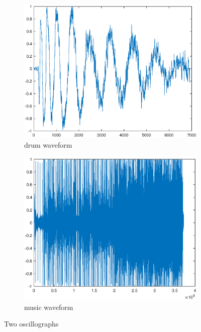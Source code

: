 \begin{figure}[h!]
	\centering
	\begin{subfigure}[t]{0.45\linewidth}
		\includegraphics[width=1\linewidth]{figures/part1/drum.eps}
		\caption{drum waveform}
		\label{fig:drum}
	\end{subfigure}
	\begin{subfigure}[t]{0.45\linewidth}
		\centering
		\includegraphics[width=1\linewidth]{figures/part1/piece_of_music.eps}
		\caption{music waveform}
		\label{fig:music}
	\end{subfigure}
	\caption{Two oscillographs}
	\label{fig:wave}
\end{figure} 

